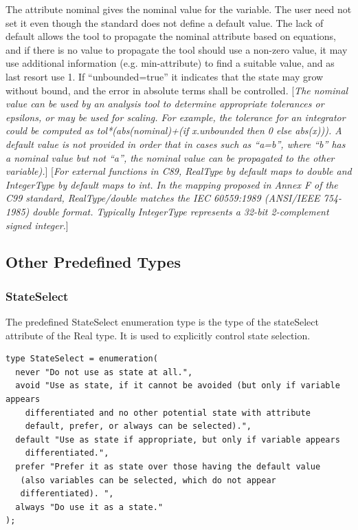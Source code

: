 \documentclass[10pt,a4paper]{report}
\def\Mcomment#1{{[}\emph{#1}{]}}
\def\doublelabel#1{\label{#1}\hypertarget{#1}{}}
\begin{document}
The attribute nominal gives the nominal value for the variable. The user need not set it even though the
standard does not define a default value. The lack of default allows the tool to propagate the nominal attribute
based on equations, and if there is no value to propagate the tool should use a non-zero value, it may use
additional information (e.g. min-attribute) to find a suitable value, and as last resort use 1. If “unbounded=true”
it indicates that the state may grow without bound, and the error in absolute terms shall be controlled. \Mcomment{The
nominal value can be used by an analysis tool to determine appropriate tolerances or epsilons, or may be used for 
scaling. For example, the tolerance for an integrator could be computed as \emph{tol*(abs(nominal)+(if
x.unbounded then 0 else abs(x)))}. A default value is not provided in order that in cases such as
“a=b”, where “b” has a nominal value but not “a”, the nominal value can be propagated to the other variable).}
\Mcomment{For external functions in C89, RealType by default maps to double and IntegerType by default maps to int. In
the mapping proposed in Annex F of the C99 standard, RealType/double matches the IEC 60559:1989
(ANSI/IEEE 754-1985) double format. Typically IntegerType represents a 32-bit 2-complement signed integer.}

\subsection{Other Predefined Types}
\subsubsection{StateSelect}\doublelabel{stateselect}

The predefined StateSelect enumeration type is the type of the
stateSelect attribute of the Real type. It is used to explicitly control
state selection.
\begin{lstlisting}[language=modelica]
type StateSelect = enumeration(
  never "Do not use as state at all.",
  avoid "Use as state, if it cannot be avoided (but only if variable appears
    differentiated and no other potential state with attribute
    default, prefer, or always can be selected).",
  default "Use as state if appropriate, but only if variable appears
    differentiated.",
  prefer "Prefer it as state over those having the default value
   (also variables can be selected, which do not appear
   differentiated). ",
  always "Do use it as a state."
);
\end{lstlisting}
\end{document}
